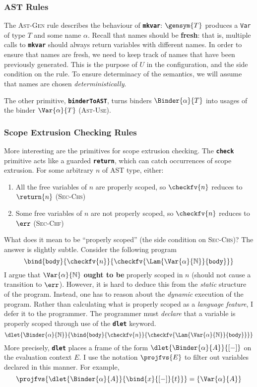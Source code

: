 \subsubsection{AST Rules}
The \textsc{Ast-Gen} rule describes the behaviour of \textbf{\texttt{mkvar}}: $\gensym{T}$ produces a \texttt{Var} of type $T$ and some name $\alpha$. Recall that names should be \textbf{fresh}: that is, multiple calls to \textbf{\texttt{mkvar}} should always return variables with different names. In order to ensure that names are fresh, we need to keep track of names that have been previously generated. This is the purpose of $U$ in the configuration, and the side condition on the rule. To ensure determinacy of the semantics, we will assume that names are chosen \textit{deterministically}.

The other primitive, \textbf{\texttt{binderToAST}}, turns binders $\Binder{\alpha}{T}$ into usages of the binder $\Var{\alpha}{T}$ (\textsc{Ast-Use}). 

\subsubsection{Scope Extrusion Checking Rules}
More interesting are the primitives for scope extrusion checking. The \textbf{\texttt{check}} primitive acts like a guarded \textbf{\texttt{return}}, which can catch occurrences of scope extrusion. For some arbitrary $n$ of AST type, either:
\begin{enumerate}
  \item All the free variables of $n$ are properly scoped, so $\checkfv{n}$ reduces to $\return{n}$ (\textsc{Sec-Chs})
  \item Some free variables of $n$ are not properly scoped, so $\checkfv{n}$ reduces to $\err$ (\textsc{Sec-Chf})
\end{enumerate}
What does it mean to be ``properly scoped'' (the side condition on \textsc{Sec-Chs})? The answer is slightly subtle. Consider the following program 
\[\bind{\texttt{body}}{\checkfv{n}}{\checkfv{\Lam{\Var{\alpha}{\mathbb{N}}}{\texttt{body}}}}\]
I argue that $\Var{\alpha}{\mathbb{N}}$ \textbf{ought to be} properly scoped in $n$ (should not cause a transition to $\err$). However, it is hard to deduce this from the \textit{static} structure of the program. Instead, one has to reason about the \textit{dynamic} execution of the program. Rather than calculating what is properly scoped as a \textit{language feature}, I defer it to the programmer. The programmer must \textit{declare} that a variable is properly scoped through use of the \textbf{\texttt{dlet}} keyword. 
\[\dlet{\Binder{\alpha}{\mathbb{N}}}{\bind{\texttt{body}}{\checkfv{n}}{\checkfv{\Lam{\Var{\alpha}{\mathbb{N}}}{\texttt{body}}}}}\]
More precisely, \textbf{\texttt{dlet}} places a frame of the form $\dlet{\Binder{\alpha}{A}}{[-]}$ on the evaluation context $E$. I use the notation $\projfvs{E}$ to filter out variables declared in this manner. For example,
\[\projfvs{\dlet{\Binder{\alpha}{A}}{\bind{x}{[-]}{t}}} = \{ \Var{\alpha}{A} \}\]

